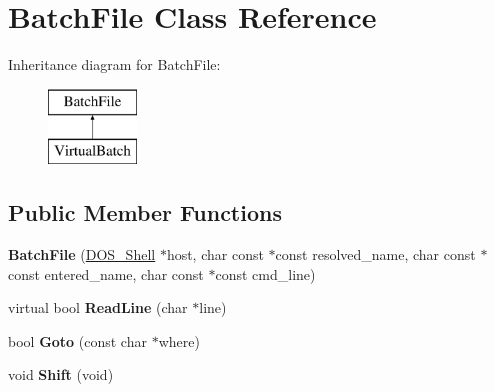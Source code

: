 \hypertarget{classBatchFile}{\section{Batch\-File Class Reference}
\label{classBatchFile}
}
Inheritance diagram for Batch\-File\-:\begin{figure}[H]
\begin{center}
\leavevmode
\includegraphics[height=2.000000cm]{classBatchFile}
\end{center}
\end{figure}
\subsection*{Public Member Functions}
\begin{DoxyCompactItemize}
\item 
\hypertarget{classBatchFile_a775abb3eea26411ba33361cc2cc24a5e}{{\bfseries Batch\-File} (\hyperlink{classDOS__Shell}{D\-O\-S\-\_\-\-Shell} $\ast$host, char const $\ast$const resolved\-\_\-name, char const $\ast$const entered\-\_\-name, char const $\ast$const cmd\-\_\-line)}\label{classBatchFile_a775abb3eea26411ba33361cc2cc24a5e}

\item 
\hypertarget{classBatchFile_ae7aff09b12fefc85bdd3004af1346abd}{virtual bool {\bfseries Read\-Line} (char $\ast$line)}\label{classBatchFile_ae7aff09b12fefc85bdd3004af1346abd}

\item 
\hypertarget{classBatchFile_ad834620328b17c39bc84cf40772ae32f}{bool {\bfseries Goto} (const char $\ast$where)}\label{classBatchFile_ad834620328b17c39bc84cf40772ae32f}

\item 
\hypertarget{classBatchFile_a41d411d2ace578a96093aefcac40f8d3}{void {\bfseries Shift} (void)}\label{classBatchFile_a41d411d2ace578a96093aefcac40f8d3}

\end{DoxyCompactItemize}
